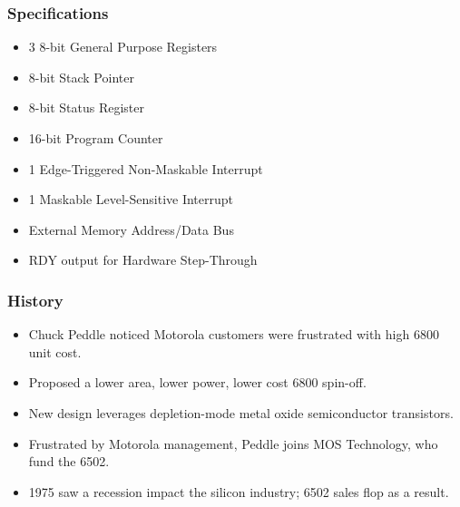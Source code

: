 \documentclass{beamer}
\begin{document}
\begin{frame}
\frametitle{Specifications}
\begin{itemize}
\item 3 8-bit General Purpose Registers
\item 8-bit Stack Pointer
\item 8-bit Status Register
\item 16-bit Program Counter
\item 1 Edge-Triggered Non-Maskable Interrupt
\item 1 Maskable Level-Sensitive Interrupt
\item External Memory Address/Data Bus
\item RDY output for Hardware Step-Through
\end{itemize}
\end{frame}

\begin{frame}
\frametitle{History}
\begin{itemize}
\item Chuck Peddle noticed Motorola customers were frustrated with high 6800 unit cost.
\item Proposed a lower area, lower power, lower cost 6800 spin-off.
\item New design leverages depletion-mode metal oxide semiconductor transistors.
\item Frustrated by Motorola management, Peddle joins MOS Technology, who fund the 6502.
\item 1975 saw a recession impact the silicon industry; 6502 sales flop as a result.
\end{itemize}
\end{frame}
\end{document}
